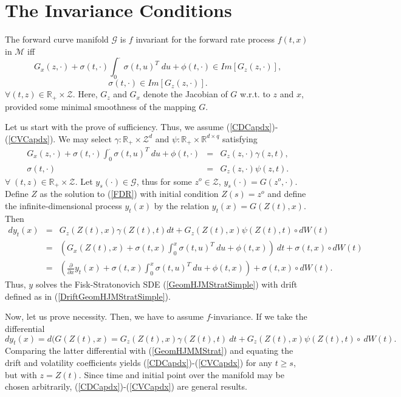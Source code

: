 \section{The Invariance Conditions}
\setcounter{tma}{3}
\begin{tma} The forward curve manifold
  $\mathcal{G}$ is $f$ invariant for the forward rate process $f(t,x)$
  in $\mathcal{M}$ iff
\begin{equation}
\label{CDCapdx}
G_x(z, \cdot)+\sigma(t,\cdot) \displaystyle \int_0^\cdot \sigma(t,u)^T
\; du+\phi(t,\cdot) \in Im \left[G_z(z,\cdot) \right],
\end{equation}
\begin{equation}
\label{CVCapdx}
\sigma(t,\cdot) \in Im \left[G_z(z,\cdot) \right].
\end{equation}
$\forall (t,z) \in \mathbb{R}_+ \times \mathcal{Z}$. Here, $G_z$ and
$G_x$ denote the Jacobian of $G$ w.r.t. to $z$ and $x$, provided some
minimal smoothness of the mapping $G$. 
\end{tma}
\begin{demo}
Let us start with the prove of sufficiency. Thus, we assume
(\ref{CDCapdx})-(\ref{CVCapdx}). We may select $\gamma: \mathbb{R_+} \times
\mathcal{Z}^d$ and  $\psi: \mathbb{R_+} \times \mathbb{R}^{d\times q}$
satisfying 
$$
\begin{array}{rcl}
G_x(z,\cdot)+\sigma(t,\cdot)\int_0^\cdot \sigma(t,u)^T\: du
+\phi(t,\cdot)&=&G_z(z, \cdot)\gamma(z,t),\\
\sigma(t,\cdot)&=& G_z(z, \cdot)\psi(z,t).
\end{array}
$$
$\forall\; (t,z) \in \mathbb{R}_+ \times \mathcal{Z}$. Let
$y_s(\cdot)\in \mathcal{G}$, thus for some $z^o \in \mathcal{Z}$,
$y_s(\cdot)=G(z^o, \cdot)$. Define $Z$ as the solution to (\ref{FDR})
with initial condition $Z(s)=z^o$ and define the infinite-dimensional
process $y_t(x)$ by the relation $y_t(x)=G(Z(t), x)$. Then
\begin{equation}
\begin{array}{rcl}
dy_t(x) & = & G_z(Z(t),
x)\gamma(Z(t),t)dt+G_z(Z(t), x)\psi(Z(t),t)\circ dW(t)\\
& = &  \left( G_x(Z(t),x) + \sigma(t,x)\int_0^x
  \sigma(t,u)^T\:du+\phi(t,x)\right)\:dt+\sigma(t,x)\circ dW(t)\\
& = & \left( \frac{\partial}{\partial
    x}y_t(x)+\sigma(t,x)\int_0^x\sigma(t,u)^T\:
  du+\phi(t,x)\right)+\sigma(t,x)\circ dW(t).
\end{array}
\end{equation}
Thus, $y$ solves the Fisk-Stratonovich SDE (\ref{GeomHJMStratSimple})
with drift defined as in (\ref{DriftGeomHJMStratSimple}). 

Now, let us prove necessity. Then, we have to assume
$f$-invariance. If we take the differential   
$$
dy_t(x)=d(G(Z(t),x)=G_z(Z(t),x)\gamma(Z(t),t)\:
dt+G_z(Z(t),x)\psi(Z(t),t)\circ\: dW(t).
$$
Comparing the latter differential with (\ref{GeomHJMMStrat}) and
equating the drift and volatility coefficients yields
(\ref{CDCapdx})-(\ref{CVCapdx}) for any $t\geq s$, but with $z=Z(t)$. Since
time and initial point over the manifold may be chosen arbitrarily,
(\ref{CDCapdx})-(\ref{CVCapdx}) are general results.
\end{demo}
